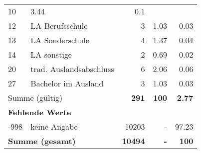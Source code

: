 \begin{longtable}{lXrrr}
       \num{10} &
       \num[round-mode=places,round-precision=2]{3.44} &
         \num[round-mode=places,round-precision=2]{0.1} \\

     12 &
     \multicolumn{1}{X}{ LA Berufsschule   } &


       \num{3} &
       \num[round-mode=places,round-precision=2]{1.03} &
         \num[round-mode=places,round-precision=2]{0.03} \\

     13 &
     \multicolumn{1}{X}{ LA Sonderschule   } &


       \num{4} &
       \num[round-mode=places,round-precision=2]{1.37} &
         \num[round-mode=places,round-precision=2]{0.04} \\

     14 &
     \multicolumn{1}{X}{ LA sonstige   } &


       \num{2} &
       \num[round-mode=places,round-precision=2]{0.69} &
         \num[round-mode=places,round-precision=2]{0.02} \\

     20 &
     \multicolumn{1}{X}{ trad. Auslandsabschluss   } &


       \num{6} &
       \num[round-mode=places,round-precision=2]{2.06} &
         \num[round-mode=places,round-precision=2]{0.06} \\

     27 &
     \multicolumn{1}{X}{ Bachelor im Ausland   } &


       \num{3} &
       \num[round-mode=places,round-precision=2]{1.03} &
         \num[round-mode=places,round-precision=2]{0.03} \\
     \midrule
     \multicolumn{2}{l}{Summe (gültig)} &
       \textbf{\num{291}} &
     \textbf{\num{100}} &
       \textbf{\num[round-mode=places,round-precision=2]{2.77}} \\
     \multicolumn{5}{l}{\textbf{Fehlende Werte}}\\
       -998 &
       keine Angabe &
         \num{10203} &
        - &
         \num[round-mode=places,round-precision=2]{97.23} \\
     \midrule
     \multicolumn{2}{l}{\textbf{Summe (gesamt)}} &
          \textbf{\num{10494}} &
        \textbf{-} &
        \textbf{\num{100}} \\
     \bottomrule
     \end{longtable}
     
